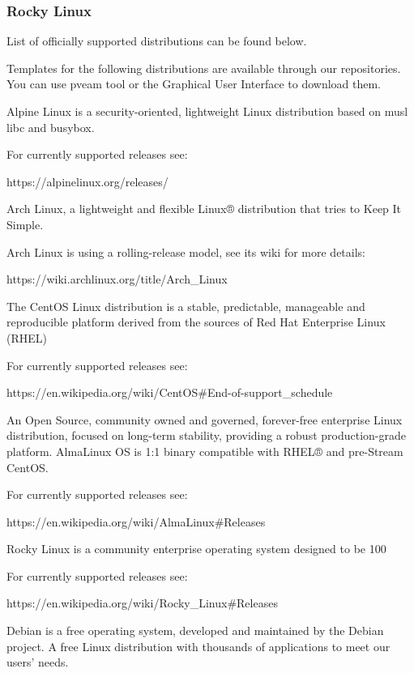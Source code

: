 \subsubsection{Rocky Linux}

List of officially supported distributions can be found below.

Templates for the following distributions are available through our repositories. You can use pveam tool or the Graphical User Interface to download them.

Alpine Linux is a security-oriented, lightweight Linux distribution based on musl libc and busybox.

For currently supported releases see:

https://alpinelinux.org/releases/

Arch Linux, a lightweight and flexible Linux® distribution that tries to Keep It Simple.

Arch Linux is using a rolling-release model, see its wiki for more details:

https://wiki.archlinux.org/title/Arch_Linux

The CentOS Linux distribution is a stable, predictable, manageable and reproducible platform derived from the sources of Red Hat Enterprise Linux (RHEL)

For currently supported releases see:

https://en.wikipedia.org/wiki/CentOS#End-of-support_schedule

An Open Source, community owned and governed, forever-free enterprise Linux distribution, focused on long-term stability, providing a robust production-grade platform. AlmaLinux OS is 1:1 binary compatible with RHEL® and pre-Stream CentOS.

For currently supported releases see:

https://en.wikipedia.org/wiki/AlmaLinux#Releases

Rocky Linux is a community enterprise operating system designed to be 100%

For currently supported releases see:

https://en.wikipedia.org/wiki/Rocky_Linux#Releases

Debian is a free operating system, developed and maintained by the Debian project. A free Linux distribution with thousands of applications to meet our users' needs.

